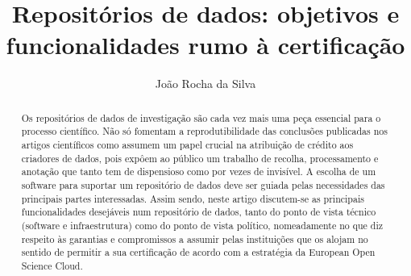 \documentclass[sigconf,nonacm]{acmart}
\begin{document}
\title{Repositórios de dados: objetivos e funcionalidades rumo à certificação}

\author{João Rocha da Silva}

\renewcommand{\shortauthors}{João Rocha da Silva}

\begin{abstract}
    Os repositórios de dados de investigação são cada vez mais uma peça essencial para o processo científico. Não só fomentam a reprodutibilidade das conclusões publicadas nos artigos científicos como assumem um papel crucial na atribuição de crédito aos criadores de dados, pois expôem ao público um trabalho de recolha, processamento e anotação que tanto tem de dispensioso como por vezes de invisível.
    A escolha de um software para suportar um repositório de dados deve ser guiada pelas necessidades das principais partes interessadas. Assim sendo, neste artigo discutem-se as principais funcionalidades desejáveis num repositório de dados, tanto do ponto de vista técnico (software e infraestrutura) como do ponto de vista político, nomeadamente no que diz respeito às garantias e compromissos a assumir pelas instituições que os alojam no sentido de permitir a sua certificação de acordo com a estratégia da European Open Science Cloud.
\end{abstract}

\end{document}
